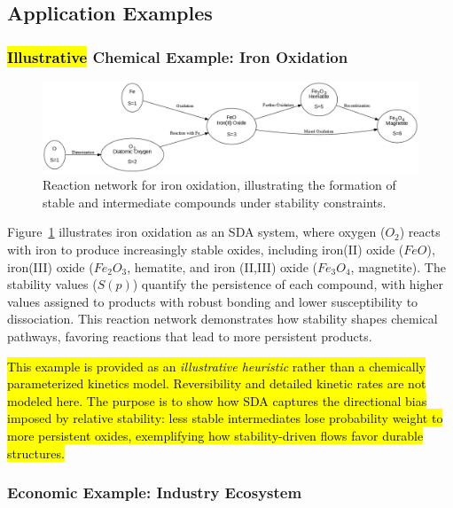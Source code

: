 \documentclass[preprint,12pt]{elsarticle}
\newcommand{\added}[1]{\hl{#1}}
\begin{document}
\subsection{Application Examples}

\subsubsection{\added{Illustrative} Chemical Example: Iron Oxidation}

\begin{figure}[h]
    \centering
    \includegraphics[width=1\textwidth,height=0.3\textwidth]{figure_13.png}
    \caption{Reaction network for iron oxidation, illustrating the formation of stable and intermediate compounds under stability constraints.}
    \label{fig:figure_13}
\end{figure}

Figure~\ref{fig:figure_13} illustrates iron oxidation as an SDA system, where oxygen (\(O_2\)) reacts with iron to produce increasingly stable oxides, including iron(II) oxide (\(FeO\)), iron(III) oxide (\(Fe_2O_3\), hematite, and iron (II,III) oxide (\(Fe_3O_4\), magnetite). The stability values (\(S(p)\)) quantify the persistence of each compound, with higher values assigned to products with robust bonding and lower susceptibility to dissociation. This reaction network demonstrates how stability shapes chemical pathways, favoring reactions that lead to more persistent products.

\added{This example is provided as an \emph{illustrative heuristic} rather than a chemically parameterized kinetics model. Reversibility and detailed kinetic rates are not modeled here. The purpose is to show how SDA captures the directional bias imposed by relative stability: less stable intermediates lose probability weight to more persistent oxides, exemplifying how stability-driven flows favor durable structures.}


\subsubsection{Economic Example: Industry Ecosystem}
\end{document}
